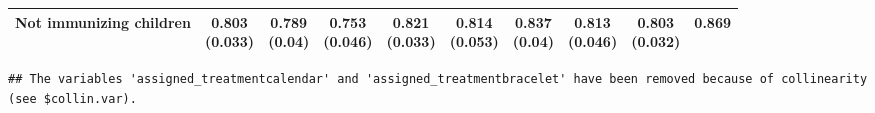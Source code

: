 \documentclass[
]{article}
\begin{document}
\begin{table}
{\begin{tabular}[t]{lccccccccc}
\hspace{1em}Not immunizing children & \makecell[c]{0.803\\(0.033)} & \makecell[c]{0.789\\(0.04)} & \makecell[c]{0.753\\(0.046)} & \makecell[c]{0.821\\(0.033)} & \makecell[c]{0.814\\(0.053)} & \makecell[c]{0.837\\(0.04)} & \makecell[c]{0.813\\(0.046)} & \makecell[c]{0.803\\(0.032)} & 0.869\\
\bottomrule
\end{tabular}}
\end{table}

\begin{verbatim}
## The variables 'assigned_treatmentcalendar' and 'assigned_treatmentbracelet' have been removed because of collinearity (see $collin.var).
\end{verbatim}
\end{document}
